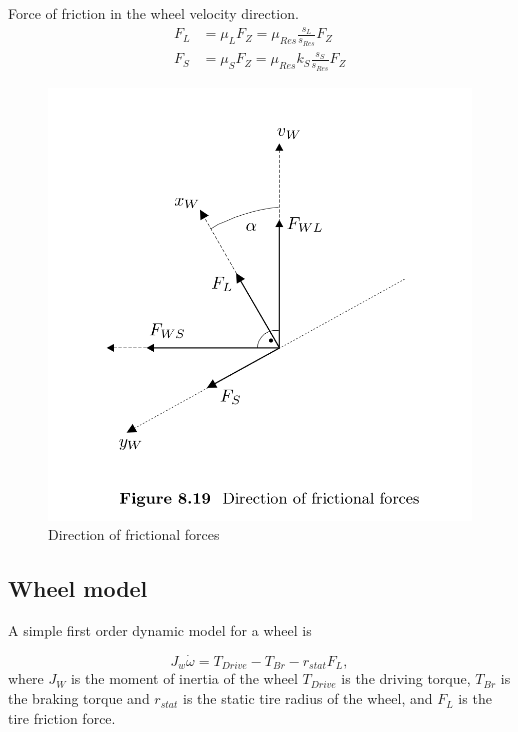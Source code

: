 Force of friction in the wheel velocity direction.
\begin{align*}
  F_{L} &= \mu_L F_Z = \mu_{Res} \frac{s_L}{s_{Res}} F_Z \\ 
  F_{S} &= \mu_S F_Z = \mu_{Res} k_S \frac{s_S}{s_{Res}} F_Z
\end{align*}


\begin{figure}
    \centering
    \includegraphics[width=\textwidth]{draft/stolen-figures/direction-of-frictional-forces.png}
    \caption{Direction of frictional forces}
    \label{fig:friction-directions}
\end{figure}



\subsection{Wheel model}

A simple first order dynamic model for a wheel is

\begin{equation}
  J_w \dot{\omega} = T_{Drive} - T_{Br} - r_{stat}F_L,
\end{equation}
where $J_W$ is the moment of inertia of the wheel $T_{Drive}$ is the driving torque, $T_{Br}$ is the braking torque and $r_{stat}$ is the static tire radius of the wheel, and $F_L$ is the tire friction force.

